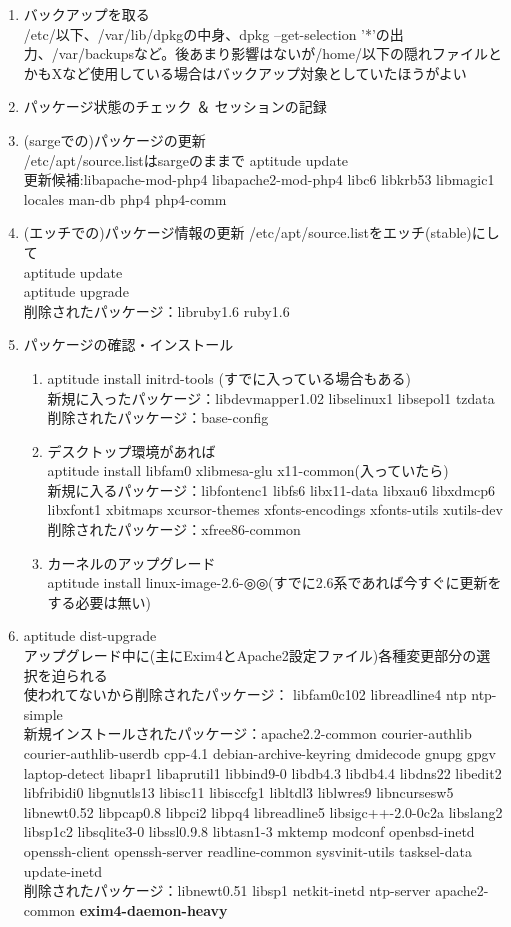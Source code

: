 \documentclass[mingoth,a4paper]{jsarticle}
\begin{document}
\begin{enumerate}
\item バックアップを取る\\
/etc/以下、/var/lib/dpkgの中身、dpkg --get-selection '*'の出力、/var/backupsなど。後あまり影響はないが/home/以下の隠れファイルとかもXなど使用している場合はバックアップ対象としていたほうがよい
\item パッケージ状態のチェック ＆ セッションの記録
\item (sargeでの)パッケージの更新 \\
/etc/apt/source.listはsargeのままで aptitude update\\
更新候補:libapache-mod-php4 libapache2-mod-php4 libc6 libkrb53 libmagic1 locales man-db php4 php4-comm
\item (エッチでの)パッケージ情報の更新
/etc/apt/source.listをエッチ(stable)にして\\
aptitude update\\
aptitude upgrade\\
削除されたパッケージ：libruby1.6 ruby1.6
\item パッケージの確認・インストール

\begin{enumerate}
\item aptitude install initrd-tools (すでに入っている場合もある)\\
新規に入ったパッケージ：libdevmapper1.02 libselinux1 libsepol1 tzdata\\
削除されたパッケージ：base-config
\item デスクトップ環境があれば\\
aptitude install libfam0 xlibmesa-glu x11-common(入っていたら)\\
新規に入るパッケージ：libfontenc1 libfs6 libx11-data libxau6 libxdmcp6 libxfont1 xbitmaps xcursor-themes xfonts-encodings xfonts-utils xutils-dev\\
削除されたパッケージ：xfree86-common
\item カーネルのアップグレード\\
aptitude install linux-image-2.6-◎◎(すでに2.6系であれば今すぐに更新をする必要は無い)
\end{enumerate}
\item aptitude dist-upgrade\\
アップグレード中に(主にExim4とApache2設定ファイル)各種変更部分の選択を迫られる\\
使われてないから削除されたパッケージ： libfam0c102 libreadline4 ntp ntp-simple\\
新規インストールされたパッケージ：apache2.2-common courier-authlib courier-authlib-userdb cpp-4.1 debian-archive-keyring dmidecode gnupg gpgv laptop-detect libapr1 libaprutil1 libbind9-0 libdb4.3 libdb4.4 libdns22 libedit2 libfribidi0 libgnutls13 libisc11 libisccfg1 libltdl3 liblwres9 libncursesw5 libnewt0.52 libpcap0.8 libpci2 libpq4 libreadline5 libsigc++-2.0-0c2a libslang2 libsp1c2 libsqlite3-0 libssl0.9.8 libtasn1-3 mktemp modconf openbsd-inetd openssh-client openssh-server readline-common sysvinit-utils tasksel-data update-inetd\\
削除されたパッケージ：libnewt0.51 libsp1 netkit-inetd ntp-server apache2-common {\bf exim4-daemon-heavy}\\


\end{enumerate}
\end{document}

